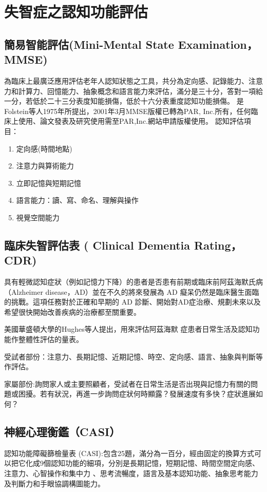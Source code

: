\chapter{失智症之認知功能評估}
\label{chapter:intro}
\section{簡易智能評估(Mini-Mental State Examination，MMSE)}
為臨床上最廣泛應用評估老年人認知狀態之工具，共分為定向感、記錄能力、注意力和計算力、回憶能力、抽象概念和語言能力來評估，滿分是三十分，答對一項給一分，若低於二十三分表度知能損傷，低於十六分表重度認知功能損傷。
是Folstein等人1975年所提出，2001年3月MMSE版權已轉為PAR, Inc.所有，任何臨床上使用、論文發表及研究使用需至PAR,Inc.網站申請版權使用。
認知評估項目：
\begin{enumerate}
	\item
    定向感(時間地點)
	\item
	注意力與算術能力
	\item
    立即記憶與短期記憶
	\item
	語言能力：讀、寫、命名、理解與操作
	\item
    視覺空間能力
\end{enumerate}

\label{sec:background}
\section{臨床失智評估表 ( Clinical Dementia Rating，CDR)}

具有輕微認知症狀（例如記憶力下降）的患者是否患有前期或臨床前阿茲海默氏病（Alzheimer disease，AD）並在不久的將來發展為 AD 癡呆仍然是臨床醫生面臨的挑戰。這項任務對於正確和早期的 AD 診斷、開始對AD症治療、規劃未來以及希望很快開始改善疾病的治療都至關重要。

美國華盛頓大學的Hughes等人提出，用來評估阿茲海默 症患者日常生活及認知功能作整體性評估的量表。

受試者部份：注意力、長期記憶、近期記憶、時空、定向感、語言、抽象與判斷等作評估。

家屬部份:詢問家人或主要照顧者，受試者在日常生活是否出現與記憶力有關的問題或困擾。若有狀況，再進一步詢問症狀何時顯露？發展速度有多快？症狀進展如何？



\section{神經心理衡鑑（CASI）}
認知功能障礙篩檢量表 (CASI):包含25題，滿分為一百分，經由固定的換算方式可以把它化成9個認知功能的細項，分別是長期記憶，短期記憶、時間空間定向感、注意力、心智操作和集中力 、思考流暢度，語言及基本認知功能、抽象思考能力及判斷力和手眼協調構圖能力。
